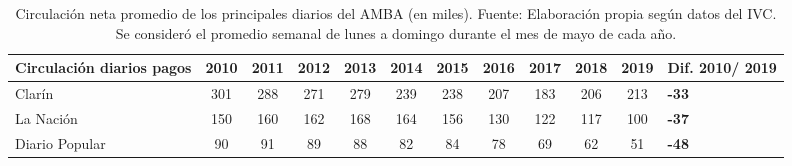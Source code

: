 \begin{table}[!ht]
\sf\footnotesize\setlength\tabcolsep{4pt}
\centering
\begin{tabular}{>{\raggedright\arraybackslash}m{1.6cm} | S[table-format=3.0] | S[table-format=3.0] | S[table-format=3.0] | S[table-format=3.0] | S[table-format=3.0] | S[table-format=3.0] | S[table-format=3.0] | S[table-format=3.0] | S[table-format=3.0] | S[table-format=3.0] | >{\raggedright\arraybackslash}m{8mm} }
	\toprule
\textbf{Circulación diarios pagos} & \textbf{2010} & \textbf{2011} & \textbf{2012} & \textbf{2013} & \textbf{2014} & \textbf{2015} & \textbf{2016} & \textbf{2017} & \textbf{2018} & \textbf{2019} & \textbf{Dif. 2010/ 2019} \\
\midrule
Clarín & 301 & 288 & 271 & 279 & 239 & 238 & 207 & 183 & 206 & 213 & \textbf{-33} \\
\midrule
La Nación & 150 & 160 & 162 & 168 & 164 & 156 & 130 & 122 & 117 & 100 & \textbf{-37} \\
\midrule
Diario Popular & 90 & 91 & 89 & 88 & 82 & 84 & 78 & 69 & 62 & 51 & \textbf{-48} \\
\bottomrule
\end{tabular}
\caption{Circulación neta promedio de los principales diarios del AMBA (en miles). Fuente: Elaboración propia según datos del IVC. Se consideró el promedio semanal de lunes a domingo durante el mes de mayo de cada año.}\label{cuadro1-2}
\end{table}
%
